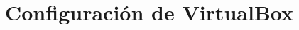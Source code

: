 \documentclass[ucs]{beamer}
\newcommand{\res}[1]{\textcolor{darkred}{#1}}
\begin{document}
%
%
%
%
%
%
%
%

%
%
%
%
%


\section{Configuración de VirtualBox}
\end{document}
